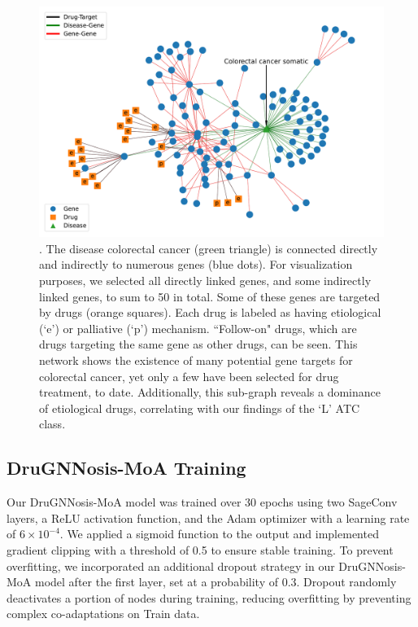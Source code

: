 \documentclass[journal,twoside,web]{ieeecolor}
\begin{document}
\begin{figure}
    \centering
    \includegraphics[width=\linewidth]{Figures/heterogeneous_networks.pdf}
    \caption{ . The disease colorectal cancer (green triangle) is connected directly and indirectly to numerous genes (blue dots).
    For visualization purposes, we selected all directly linked genes, and some indirectly linked genes, to sum to 50 in total.
    Some of these genes are targeted by drugs (orange squares). Each drug is labeled as having etiological (`e') or palliative (`p') mechanism.
    ``Follow-on" drugs, which are drugs targeting the same gene as other drugs, can be seen.
    This network shows the existence of many potential gene targets for colorectal cancer, yet only a few have been selected for drug treatment, to date. Additionally, this sub-graph reveals a dominance of etiological drugs, correlating with our findings of the `L’ ATC class.}
    \label{fig:heteroSubGraph}
\end{figure}


\subsection{DruGNNosis-MoA Training}
Our DruGNNosis-MoA model was trained over 30 epochs using two SageConv layers, a ReLU activation function, and the Adam optimizer with a learning rate of \(6 \times 10^{-4}\).
We applied a sigmoid function to the output and implemented gradient clipping with a threshold of 0.5 to ensure stable training.
To prevent overfitting, we incorporated an additional dropout strategy in our DruGNNosis-MoA model after the first layer, set at a probability of 0.3.
Dropout randomly deactivates a portion of nodes during training, reducing overfitting by preventing complex co-adaptations on Train data.
\end{document}
